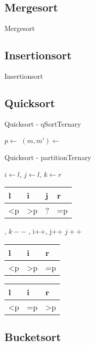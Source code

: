 \documentclass[18pt]{beamer}
\begin{document}
\subsection{Mergesort}
\begin{frame}{Mergesort}
\end{frame}

\subsection{Insertionsort}
\begin{frame}{Insertionsort}
\end{frame}

\subsection{Quicksort}
\begin{frame}[fragile]{Quicksort - qSortTernary}
\begin{algorithmic}
   \Return \EndIf
  \State $p \gets $ 
  \State $(m,m') \gets $ 
  \State {}
  \State {}
 \EndProcedure
\end{algorithmic}

\end{frame}

\begin{frame}[fragile]{Quicksort - partitionTernary}
\small
\begin{algorithmic}
  \State $i \gets l$, $j \gets l$, $k \gets r$
  \State \Comment \begin{tabular}{|l|l|l|l|}
	  \hline
	  l & i & j & r \\	  \hline
           \textless p & \textgreater  p & ? & =p \\
           \hline
         \end{tabular}
     , $k--$
     , i++, j++
    \Else \text{ } $j++$
    \EndIf
  \EndWhile
  \State \Comment \begin{tabular}{|l|l|l|}
	  \hline
	  l & i  & r \\	  \hline
           \textless p & \textgreater  p & =p \\
           \hline
         \end{tabular}
     
    \Else \text{ } 
    \EndIf
      \State \Comment \begin{tabular}{|l|l|l|}
	  \hline
	  l & i  & r \\	  \hline
           \textless p & =p & \textgreater  p \\
           \hline
         \end{tabular}
 \EndFunction
\end{algorithmic}

\end{frame}

\subsection{Bucketsort}
\end{document}
